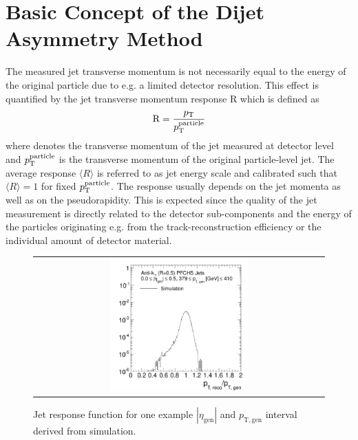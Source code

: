 \section{Basic Concept of the Dijet Asymmetry Method}
\label{sec:jer_method}
The measured jet transverse momentum is not necessarily equal to the energy of the original particle due to e.g. a limited detector resolution. This effect is quantified by the jet transverse momentum response R which is defined as 
\begin{equation}
  \mathrm{R} = \frac{p_{\text{T}}}{p_{\text{T}}^{\mathrm{particle}}} 
  \label{eq:response}
 \end{equation}
where \pt denotes the transverse momentum of the jet measured at detector level and $p_{\text{T}}^{\rm{particle}}$ is the transverse momentum of the original particle-level jet. The average response $\langle R \rangle$ is referred to as jet energy scale and calibrated such that $\langle R \rangle = 1$ for fixed $p_{\text{T}}^{\mathrm{particle}}$. The response usually depends on the jet momenta as well as on the pseudorapidity. This is expected since the quality of the jet measurement is directly related to the detector sub-components and the energy of the particles originating e.g. from the track-reconstruction efficiency or the individual amount of detector material. \\
\begin{figure}[!htp]
  \centering
  \begin{tabular}{c}
                \includegraphics[width=0.49\textwidth]{figures/TruthResponse_example_final_nominal_v4.pdf}
  \end{tabular}
  \caption{Jet response function for one example $|\eta_\mathrm{gen}|$ and $p_\mathrm{T, gen}$ interval derived from simulation.}
  \label{fig:response}
\end{figure}
